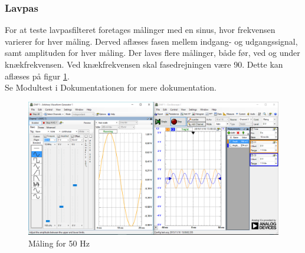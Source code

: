 \subsubsection{Lavpas}
For at teste lavpasfilteret foretages målinger med en sinus, hvor frekvensen varierer for hver måling. Derved aflæses fasen mellem indgang- og udgangssignal, samt amplituden for hver måling. Der laves flere målinger, både før, ved og under knækfrekvensen. 
Ved knækfrekvensen skal fasedrejningen være 90\textdegree. Dette kan aflæses på figur \ref{fig:maeling50Hz}.\\
Se Modultest i Dokumentationen for mere dokumentation.  
\begin{figure}[H]
	\centering
	\includegraphics[width=1.0\textwidth]{Figurer/50Hz}
	\caption{Måling for 50 Hz}
	\label{fig:maeling50Hz}
\end{figure}


